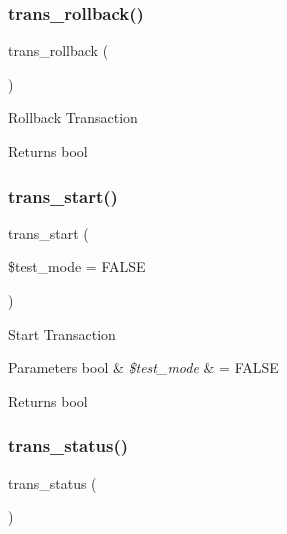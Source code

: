 \subsubsection{\texorpdfstring{trans\+\_\+rollback()}{trans\_rollback()}}
{\footnotesize\ttfamily trans\+\_\+rollback (\begin{DoxyParamCaption}{ }\end{DoxyParamCaption})}

Rollback Transaction

\begin{DoxyReturn}{Returns}
bool 
\end{DoxyReturn}
\mbox{\label{class_c_i___d_b__driver_ab082d21c9a77398c6d6705d9e978fb20}} 
\subsubsection{\texorpdfstring{trans\+\_\+start()}{trans\_start()}}
{\footnotesize\ttfamily trans\+\_\+start (\begin{DoxyParamCaption}\item[{}]{\$test\+\_\+mode = {\ttfamily FALSE} }\end{DoxyParamCaption})}

Start Transaction


\begin{DoxyParams}[1]{Parameters}
bool & {\em \$test\+\_\+mode} & = F\+A\+L\+SE \\
\hline
\end{DoxyParams}
\begin{DoxyReturn}{Returns}
bool 
\end{DoxyReturn}
\mbox{\label{class_c_i___d_b__driver_a7ce49452153f13afde8f9c5212028be6}} 
\subsubsection{\texorpdfstring{trans\+\_\+status()}{trans\_status()}}
{\footnotesize\ttfamily trans\+\_\+status (\begin{DoxyParamCaption}{ }\end{DoxyParamCaption})}

